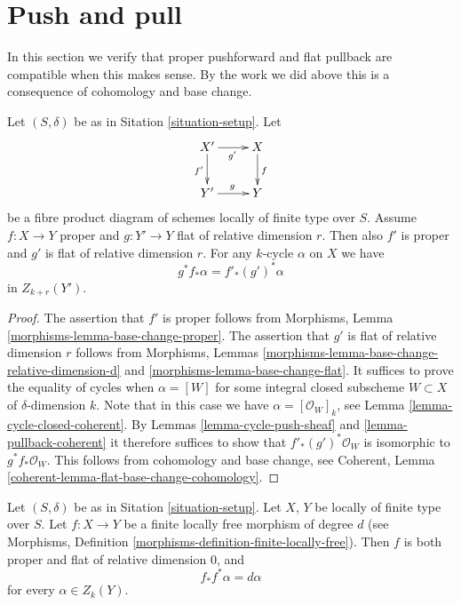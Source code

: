 \section{Push and pull}
\label{section-push-pull}

\noindent
In this section we verify that proper pushforward and flat pullback
are compatible when this makes sense. By the work we did above this
is a consequence of cohomology and base change.

\begin{lemma}
\label{lemma-flat-pullback-proper-pushforward}
Let $(S, \delta)$ be as in Sitation \ref{situation-setup}.
Let
$$
\xymatrix{
X' \ar[r]_{g'} \ar[d]_{f'} & X \ar[d]^f \\
Y' \ar[r]^g & Y
}
$$
be a fibre product diagram of schemes locally of finite type over $S$.
Assume $f : X \to Y$ proper and $g : Y' \to Y$ flat of relative dimension $r$.
Then also $f'$ is proper and $g'$ is flat of relative dimension $r$.
For any $k$-cycle $\alpha$ on $X$ we have
$$
g^*f_*\alpha = f'_*(g')^*\alpha
$$
in $Z_{k + r}(Y')$.
\end{lemma}

\begin{proof}
The assertion that $f'$ is proper follows from
Morphisms, Lemma \ref{morphisms-lemma-base-change-proper}.
The assertion that $g'$ is flat of relative dimension $r$ follows from
Morphisms, Lemmas \ref{morphisms-lemma-base-change-relative-dimension-d}
and \ref{morphisms-lemma-base-change-flat}.
It suffices to prove the equality of cycles when $\alpha = [W]$
for some integral closed subscheme $W \subset X$ of $\delta$-dimension $k$.
Note that in this case we have $\alpha = [\mathcal{O}_W]_k$, see
Lemma \ref{lemma-cycle-closed-coherent}.
By Lemmas \ref{lemma-cycle-push-sheaf} and
\ref{lemma-pullback-coherent} it therefore suffices
to show that $f'_*(g')^*\mathcal{O}_W$ is isomorphic to
$g^*f_*\mathcal{O}_W$. This follows from cohomology and
base change, see
Coherent, Lemma \ref{coherent-lemma-flat-base-change-cohomology}.
\end{proof}

\begin{lemma}
\label{lemma-finite-flat}
Let $(S, \delta)$ be as in Sitation \ref{situation-setup}.
Let $X$, $Y$ be locally of finite type over $S$.
Let $f : X \to Y$ be a finite locally free morphism
of degree $d$ (see
Morphisms, Definition \ref{morphisms-definition-finite-locally-free}).
Then $f$ is both proper and flat of relative dimension $0$, and
$$
f_*f^*\alpha = d\alpha
$$
for every $\alpha \in Z_k(Y)$.
\end{lemma}

